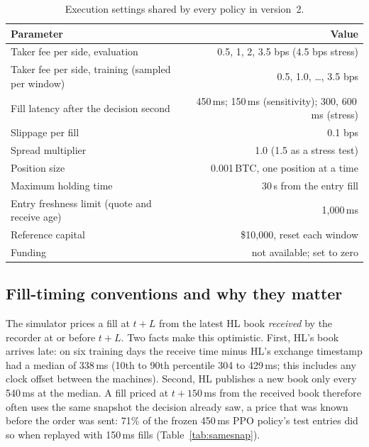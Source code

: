 \documentclass[12pt,a4paper]{article}
\DeclareRobustCommand{\bps}{\ifmmode\,\text{bps}\else\,bps\fi}
\newcommand{\usd}[1]{\$#1}
\begin{document}
\begin{table}[!htbp]
\centering
\caption{Execution settings shared by every policy in version~2.}
\label{tab:env}
\small
\begin{tabular}{@{}lr@{}}
\toprule
Parameter & Value \\
\midrule
Taker fee per side, evaluation & 0.5, 1, 2, 3.5\bps{} (4.5\bps{} stress) \\
Taker fee per side, training (sampled per window) & 0.5, 1.0, \ldots, 3.5\bps{} \\
Fill latency after the decision second & 450\,ms; 150\,ms (sensitivity); 300, 600\,ms (stress) \\
Slippage per fill & 0.1\bps \\
Spread multiplier & 1.0 (1.5 as a stress test) \\
Position size & 0.001\,BTC, one position at a time \\
Maximum holding time & 30\,s from the entry fill \\
Entry freshness limit (quote and receive age) & 1,000\,ms \\
Reference capital & \usd{10,000}, reset each window \\
Funding & not available; set to zero \\
\bottomrule
\end{tabular}
\end{table}

\subsection{Fill-timing conventions and why they matter}\label{sec:filltiming}
The simulator prices a fill at $t+L$ from the latest HL book \emph{received} by the recorder at
or before $t+L$. Two facts make this optimistic. First, HL's book arrives late: on six
training days the receive time minus HL's exchange timestamp had a median of 338\,ms
(10th to 90th percentile 304 to 429\,ms; this includes any clock offset between the machines).
Second, HL publishes a new book only every 540\,ms at the median. A fill priced at
$t+150$\,ms from the received book therefore often uses the same snapshot the decision already
saw, a price that was known before the order was sent: 71\% of the frozen 450\,ms PPO
policy's test entries did so when replayed with 150\,ms fills (Table~\ref{tab:samesnap}).
\end{document}
